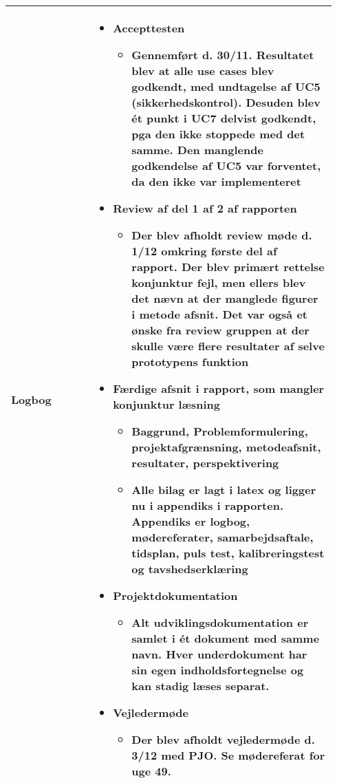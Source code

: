 \begin{longtable}{|p{0.24\linewidth}|p{0.7\linewidth}|}
		\\ \hline
		Logbog & 
		\begin{itemize}
			\item Accepttesten 
			\begin{itemize}
				\item Gennemført d. 30/11. Resultatet blev at alle use cases blev godkendt, med undtagelse af UC5 (sikkerhedskontrol). Desuden blev ét punkt i UC7 delvist godkendt, pga den ikke stoppede med det samme. Den manglende godkendelse af UC5 var forventet, da den ikke var implementeret
			\end{itemize}
			\item Review af del 1 af 2 af rapporten
			\begin{itemize}
				\item Der blev afholdt review møde d. 1/12 omkring første del af rapport. Der blev primært rettelse konjunktur fejl, men ellers blev det nævn at der manglede figurer i metode afsnit. Det var også et ønske fra review gruppen at der skulle være flere resultater af selve prototypens funktion
			\end{itemize}
			\item Færdige afsnit i rapport, som mangler konjunktur læsning
			\begin{itemize}
				\item Baggrund, Problemformulering, projektafgrænsning, metodeafsnit, resultater, perspektivering
				\item Alle bilag er lagt i latex og ligger nu i appendiks i rapporten. Appendiks er logbog, mødereferater, samarbejdsaftale, tidsplan, puls test, kalibreringstest og tavshedserklæring
			\end{itemize}
			\item Projektdokumentation
			\begin{itemize}
				\item Alt udviklingsdokumentation er samlet i ét dokument med samme navn. Hver underdokument har sin egen indholdsfortegnelse og kan stadig læses separat. 
			\end{itemize}
			\item Vejledermøde
			\begin{itemize}
				\item Der blev afholdt vejledermøde d. 3/12 med PJO. Se mødereferat for uge 49. 
			\end{itemize}
		\end{itemize}
		\\ \hline
	\end{longtable}
	
